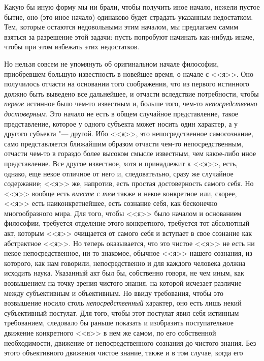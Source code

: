 Какую бы иную форму мы ни брали, чтобы получить иное начало, нежели
пустое бытие, оно (это иное начало) одинаково будет страдать указанным
недостатком. Тем, которые остаются недовольными этим началом, мы предлагаем
самим взяться за разрешение этой задачи: пусть попробуют начинать
как-нибудь иначе, чтобы при этом избежать этих недостатков.

Но нельзя совсем не упомянуть об оригинальном начале философии, приобревшем
большую известность в новейшее время, о начале с
<<я>>.
Оно получилось отчасти на основании того соображения, что из первого
истинного должно быть выведено все дальнейшее, и отчасти вследствие
потребности, чтобы {\em первое} истинное было чем-то
известным и, больше того, чем-то {\em непосредственно
достоверным}. Это начало не есть в общем случайное представление, такое
представление, которое у одного субъекта может носить один характер, а у
другого субъекта "--- другой. Ибо <<я>>, это непосредственное самосознание, само
представляется ближайшим образом отчасти чем-то непосредственным, отчасти
чем-то в гораздо более высоком смысле известным, чем какое-либо иное
представление. Все другое известное, хотя и принадлежит к <<я>>, есть,
однако, еще некое отличное от него и, следовательно, сразу же случайное
содержание; <<я>> же, напротив, есть простая достоверность самого себя. Но
<<я>> вообще есть {\em вместе с тем} также и некое
конкретное или, скорее, <<я>> есть наиконкретнейшее, есть сознание себя, как
бесконечно многообразного мира. Для того, чтобы <<я>> было началом и
основанием философии, требуется отделение этого конкретного, требуется тот
абсолютный акт, которым <<я>> очищается от самого себя и вступает в свое
сознание как абстрактное <<я>>. Но теперь оказывается, что это чистое <<я>> не
есть ни некое непосредственное, ни то знакомое, обычное <<я>> нашего
сознания, из которого, как нам говорили, непосредственно и для каждого
человека должна исходить наука. Указанный акт был бы, собственно говоря, не
чем иным, как возвышением на точку зрения чистого знания, на которой
исчезает различие между субъективным и объективным. Но ввиду требования,
чтобы это возвышение носило столь
{\em непосредственный} характер, оно есть лишь некий
субъективный постулат. Для того, чтобы этот постулат явил себя истинным
требованием, следовало бы раньше показать и изобразить поступательное
движение конкретного <<я>> в нем же самом, по его собственной необходимости,
движение от непосредственного сознания до чистого знания. Без этого
объективного движения чистое знание, также и в том случае, когда его
